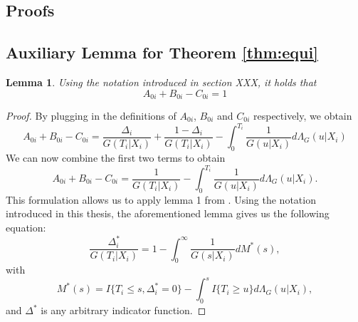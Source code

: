 \documentclass[12pt, a4paper]{article}
\theoremstyle{definition}
\theoremstyle{plain}
\newtheorem{Lemma}{Lemma}[section]
\numberwithin{equation}{section}
\numberwithin{figure}{section}
\numberwithin{table}{section}
\begin{document}
	\begin{appendices}
		\section{Proofs}
		\subsection{Auxiliary Lemma for Theorem \ref{thm:equi}}\label{proof:strawderman}
		
		\begin{Lemma}\label{lem:equi}
			Using the notation introduced in section XXX, it holds that 
			\begin{equation*}
				A_{0i}+B_{0i}-C_{0i}=1
			\end{equation*}
		\end{Lemma}
		\begin{proof}
			By plugging in the definitions of $A_{0i}$, $B_{0i}$ and $C_{0i}$ respectively, we obtain
			\begin{equation*}
			A_{0i}+B_{0i}-C_{0i} = \frac{\Delta_i}{G(T_i\vert X_i)} + \frac{1-\Delta_i}{G(T_i\vert X_i)} - \int_{0}^{T_i}\frac{1}{G(u\vert X_i)}d\Lambda_G(u\vert X_i)
			\end{equation*}
			We can now combine the first two terms to obtain
			\begin{equation}\label{eq:lemma}
			A_{0i}+B_{0i}-C_{0i} = \frac{1}{G(T_i \vert X_i)} - \int_{0}^{T_i}\frac{1}{G(u\vert X_i)}d\Lambda_G(u\vert X_i).
			\end{equation}
			This formulation allows us to apply lemma 1 from \citet*{strawderman}.
			Using the notation introduced in this thesis, the aforementioned lemma gives us the following equation:
			\begin{equation}\label{eq:straw}
			\frac{\Delta^*_i}{G(T_i\vert X_i)} = 1 - \int_{0}^{\infty} \frac{1}{G(s\vert X_i)} dM^*(s),
			\end{equation}
			with
			\begin{equation*}
			M^*(s) = I\{T_i \leq s, \Delta^*_i=0\} - \int_{0}^s I\{T_i\geq u\}d\Lambda_G(u\vert X_i),
			\end{equation*}
			and $\Delta^*$ is any arbitrary indicator function.
			

\end{proof}
\end{appendices}
\end{document}
